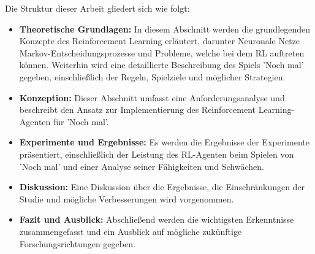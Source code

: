 Die Struktur dieser Arbeit gliedert sich wie folgt:
\begin{itemize}

    \item \textbf{Theoretische Grundlagen:} In diesem Abschnitt werden die grundlegenden Konzepte des Reinforcement Learning erläutert, darunter Neuronale Netze Markov-Entscheidungsprozesse und Probleme, welche bei dem RL auftreten können. Weiterhin wird eine detaillierte Beschreibung des Spiels 'Noch mal' gegeben, einschließlich der Regeln, Spielziele und möglicher Strategien.
    \item \textbf{Konzeption:} Dieser Abschnitt umfasst eine Anforderungsanalyse und  beschreibt den Ansatz zur Implementierung des Reinforcement Learning-Agenten für 'Noch mal'. 
    \item \textbf{Experimente und Ergebnisse:} Es werden die Ergebnisse der Experimente präsentiert, einschließlich der Leistung des RL-Agenten beim Spielen von 'Noch mal' und einer Analyse seiner Fähigkeiten und Schwächen.
    \item \textbf{Diskussion:} Eine Diskussion über die Ergebnisse, die Einschränkungen der Studie und mögliche Verbesserungen wird vorgenommen.
    \item \textbf{Fazit und Ausblick:} Abschließend werden die wichtigsten Erkenntnisse zusammengefasst und ein Ausblick auf mögliche zukünftige Forschungsrichtungen gegeben.
\end{itemize}


